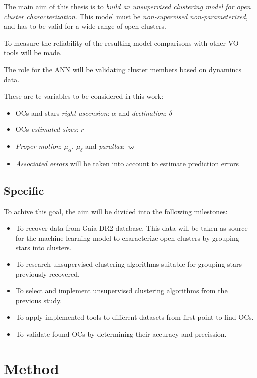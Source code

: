 \documentclass[11pt, a4paper, english]{book}
\begin{document}
The main aim of this thesis is to \emph{build an unsupervised clustering model for open cluster characterization}.
This model must be \emph{non-supervised non-parameterized}, and has to be valid for a wide range of open clusters.

To measure the reliability of the resulting model comparisons with other VO tools will be made.

The role for the ANN will be validating cluster members based on dynamincs data.

These are te variables to be considered in this work:

\begin{itemize}
  \item OCs and stars \emph{right ascension}: $\alpha$ and \emph{declination}: $\delta$
  \item OCs \emph{estimated sizes}: $r$
  \item \emph{Proper motion}: $\mu_{\alpha}$, $\mu_{\delta}$ and \emph{parallax}: $\varpi$
  \item \emph{Associated errors} will be taken into account to estimate prediction errors
\end{itemize}

\section{Specific}

To achive this goal, the aim will be divided into the following milestones:

\begin{itemize}
  \item To recover data from Gaia DR2 database. This data will be taken as source for the machine learning model to characterize open clusters
  by grouping stars into clusters.
  \item To research unsupervised clustering algorithms suitable for grouping stars previously recovered.
  \item To select and implement unsupervised clustering algorithms from the previous study.
  \item To apply implemented tools to different datasets from first point to find OCs.
  \item To validate found OCs by determining their accuracy and precission.
\end{itemize}

\chapter{Method}
\end{document}
